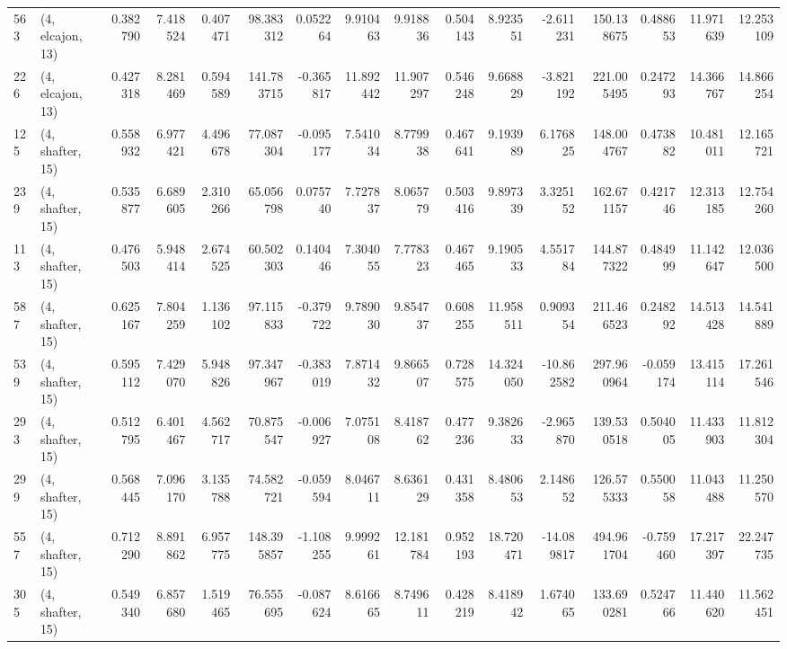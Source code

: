 \begin{tabular}{llrrrrrrrrrrrrrr}
563 &  (4, elcajon, 13) &   0.382790 &   7.418524 &   0.407471 &    98.383312 &   0.052264 &   9.910463 &   9.918836 &  0.504143 &   8.923551 &  -2.611231 &   150.138675 &  0.488653 &  11.971639 &  12.253109 \\
226 &  (4, elcajon, 13) &   0.427318 &   8.281469 &   0.594589 &   141.783715 &  -0.365817 &  11.892442 &  11.907297 &  0.546248 &   9.668829 &  -3.821192 &   221.005495 &  0.247293 &  14.366767 &  14.866254 \\
125 &  (4, shafter, 15) &   0.558932 &   6.977421 &   4.496678 &    77.087304 &  -0.095177 &   7.541034 &   8.779938 &  0.467641 &   9.193989 &   6.176825 &   148.004767 &  0.473882 &  10.481011 &  12.165721 \\
239 &  (4, shafter, 15) &   0.535877 &   6.689605 &   2.310266 &    65.056798 &   0.075740 &   7.727837 &   8.065779 &  0.503416 &   9.897339 &   3.325152 &   162.671157 &  0.421746 &  12.313185 &  12.754260 \\
113 &  (4, shafter, 15) &   0.476503 &   5.948414 &   2.674525 &    60.502303 &   0.140446 &   7.304055 &   7.778323 &  0.467465 &   9.190533 &   4.551784 &   144.877322 &  0.484999 &  11.142647 &  12.036500 \\
587 &  (4, shafter, 15) &   0.625167 &   7.804259 &   1.136102 &    97.115833 &  -0.379722 &   9.789030 &   9.854737 &  0.608255 &  11.958511 &   0.909354 &   211.466523 &  0.248292 &  14.513428 &  14.541889 \\
539 &  (4, shafter, 15) &   0.595112 &   7.429070 &   5.948826 &    97.347967 &  -0.383019 &   7.871432 &   9.866507 &  0.728575 &  14.324050 & -10.862582 &   297.960964 & -0.059174 &  13.415114 &  17.261546 \\
293 &  (4, shafter, 15) &   0.512795 &   6.401467 &   4.562717 &    70.875547 &  -0.006927 &   7.075108 &   8.418762 &  0.477236 &   9.382633 &  -2.965870 &   139.530518 &  0.504005 &  11.433903 &  11.812304 \\
299 &  (4, shafter, 15) &   0.568445 &   7.096170 &   3.135788 &    74.582721 &  -0.059594 &   8.046711 &   8.636129 &  0.431358 &   8.480653 &   2.148652 &   126.575333 &  0.550058 &  11.043488 &  11.250570 \\
557 &  (4, shafter, 15) &   0.712290 &   8.891862 &   6.957775 &   148.395857 &  -1.108255 &   9.999261 &  12.181784 &  0.952193 &  18.720471 & -14.089817 &   494.961704 & -0.759460 &  17.217397 &  22.247735 \\
305 &  (4, shafter, 15) &   0.549340 &   6.857680 &   1.519465 &    76.555695 &  -0.087624 &   8.616665 &   8.749611 &  0.428219 &   8.418942 &   1.674065 &   133.690281 &  0.524766 &  11.440620 &  11.562451 \\

\end{tabular}
